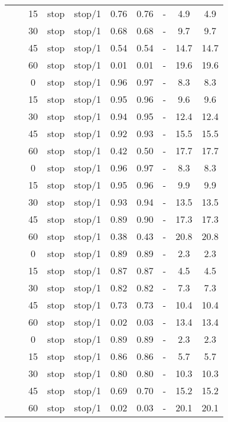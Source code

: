\begin{longtable}[t]{cccccccccc}
	\nopagebreak
	&  & 15 & stop & stop/1 & 0.76 & 0.76 & - & 4.9 & 4.9\\
	\nopagebreak
	&  & 30 & stop & stop/1 & 0.68 & 0.68 & - & 9.7 & 9.7\\
	\nopagebreak
	&  & 45 & stop & stop/1 & 0.54 & 0.54 & - & 14.7 & 14.7\\
	\nopagebreak
	\multirow{-10}{*}{\centering\arraybackslash 13} & \multirow{-5}{*}{\centering\arraybackslash 0.33} & 60 & stop & stop/1 & 0.01 & 0.01 & - & 19.6 & 19.6\\
	\cmidrule{1-10}\pagebreak[0]
	&  & 0 & stop & stop/1 & 0.96 & 0.97 & - & 8.3 & 8.3\\
	\nopagebreak
	&  & 15 & stop & stop/1 & 0.95 & 0.96 & - & 9.6 & 9.6\\
	\nopagebreak
	&  & 30 & stop & stop/1 & 0.94 & 0.95 & - & 12.4 & 12.4\\
	\nopagebreak
	&  & 45 & stop & stop/1 & 0.92 & 0.93 & - & 15.5 & 15.5\\
	\nopagebreak
	& \multirow{-5}{*}{\centering\arraybackslash 0.2} & 60 & stop & stop/1 & 0.42 & 0.50 & - & 17.7 & 17.7\\
	\nopagebreak
	&  & 0 & stop & stop/1 & 0.96 & 0.97 & - & 8.3 & 8.3\\
	\nopagebreak
	&  & 15 & stop & stop/1 & 0.95 & 0.96 & - & 9.9 & 9.9\\
	\nopagebreak
	&  & 30 & stop & stop/1 & 0.93 & 0.94 & - & 13.5 & 13.5\\
	\nopagebreak
	&  & 45 & stop & stop/1 & 0.89 & 0.90 & - & 17.3 & 17.3\\
	\nopagebreak
	\multirow{-10}{*}{\centering\arraybackslash 14} & \multirow{-5}{*}{\centering\arraybackslash 0.33} & 60 & stop & stop/1 & 0.38 & 0.43 & - & 20.8 & 20.8\\
	\cmidrule{1-10}\pagebreak[0]
	&  & 0 & stop & stop/1 & 0.89 & 0.89 & - & 2.3 & 2.3\\
	\nopagebreak
	&  & 15 & stop & stop/1 & 0.87 & 0.87 & - & 4.5 & 4.5\\
	\nopagebreak
	&  & 30 & stop & stop/1 & 0.82 & 0.82 & - & 7.3 & 7.3\\
	\nopagebreak
	&  & 45 & stop & stop/1 & 0.73 & 0.73 & - & 10.4 & 10.4\\
	\nopagebreak
	& \multirow{-5}{*}{\centering\arraybackslash 0.2} & 60 & stop & stop/1 & 0.02 & 0.03 & - & 13.4 & 13.4\\
	\nopagebreak
	&  & 0 & stop & stop/1 & 0.89 & 0.89 & - & 2.3 & 2.3\\
	\nopagebreak
	&  & 15 & stop & stop/1 & 0.86 & 0.86 & - & 5.7 & 5.7\\
	\nopagebreak
	&  & 30 & stop & stop/1 & 0.80 & 0.80 & - & 10.3 & 10.3\\
	\nopagebreak
	&  & 45 & stop & stop/1 & 0.69 & 0.70 & - & 15.2 & 15.2\\
	\nopagebreak
	\multirow{-10}{*}{\centering\arraybackslash 15} & \multirow{-5}{*}{\centering\arraybackslash 0.33} & 60 & stop & stop/1 & 0.02 & 0.03 & - & 20.1 & 20.1\\*
\end{longtable}
\endgroup{}


